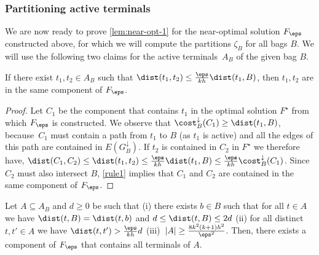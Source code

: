 %
%

\subsubsection{Partitioning active terminals}

We are now ready to prove \autoref{lem:near-opt-1} for the near-optimal solution $F_\eps$ constructed above, for which we will compute the partitions $\zeta_B$ for all bags $B$.
We will use the following two claims for the active terminals~$A_B$ of the given bag $B$.

\begin{claim}\label{claim:1}%
If there exist $t_1,t_2\in A_B$ such that $\dist(t_1,t_2)\le \frac{\eps}{kh}\dist(t_1,B)$, then $t_1,t_2$ are in the same component of $F_\eps$.
\end{claim}

%
\begin{proof}%
Let $C_1$ be the component that contains $t_1$ in the optimal
solution $F^\star$ from which $F_\eps$ is constructed. We observe that
$\cost^\downarrow_{B}(C_1)\ge \dist(t_1,B)$, because~$C_1$ must contain a path
from $t_1$ to $B$ (as $t_1$ is active) and all the edges of this path are
contained in $E(G_{B}^\downarrow)$. If $t_2$ is contained in $C_2$ in $F^\star$
we therefore have, $\dist(C_1,C_2)\le \dist(t_1,t_2)\le
\frac{\eps}{kh}\dist(t_1,B) \le \frac{\eps}{kh} \cost^\downarrow_{B}(C_1)$.
Since $C_2$ must also intersect $B$, \autoref{rule1} implies that $C_1$ and
$C_2$ are contained in the same component of $F_\eps$.  \end{proof}   
%

\begin{claim}\label{claim:2} %
    Let $A\subseteq A_B$ and $d\ge 0$ be such that (i) there exists $b\in B$ such that for all $t\in A$ we have $\dist(t,B)=\dist(t,b)$ and $d\le \dist(t,B)\le 2d$ (ii) for all distinct $t,t'\in A$ we have $\dist(t,t')> \frac{\eps}{kh}d$ (iii)~$|A|\ge \frac{8k^2(k+1)h^2}{\eps^2}$. Then, there exists a component of $F_\eps$ that contains all terminals of $A$.
\end{claim}


